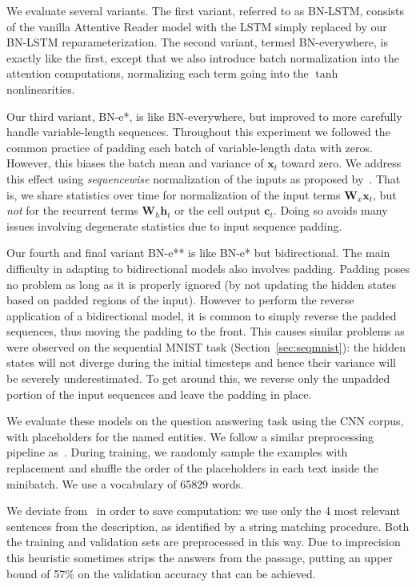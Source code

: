 \documentclass{article} %
\newcommand{\vect}[1]{\mathbf{#1}}
\newcommand{\mat}[1]{\mathbf{#1}}
\begin{document}
We evaluate several variants.
The first variant, referred to as BN-LSTM, consists of the vanilla Attentive Reader model with the LSTM simply replaced by our BN-LSTM reparameterization.
The second variant, termed BN-everywhere, is exactly like the first, except that we also introduce batch normalization into the attention computations, normalizing each term going into the $\tanh$ nonlinearities.

Our third variant, BN-e*, is like BN-everywhere, but improved to more carefully handle variable-length sequences.
Throughout this experiment we followed the common practice of padding each batch of variable-length data with zeros.
However, this biases the batch mean and variance of $\vect{x}_t$ toward zero.
We address this effect using \emph{sequencewise} normalization of the inputs as proposed by~\citep{cesar,baidu}.
That is, we share statistics over time for normalization of the input terms $\mat{W}_x \vect{x}_t$,
but \emph{not} for the recurrent terms $\mat{W}_h \vect{h}_t$ or the cell output $\vect{c}_t$.
Doing so avoids many issues involving degenerate statistics due to input sequence padding.

Our fourth and final variant BN-e** is like BN-e* but bidirectional.
The main difficulty in adapting to bidirectional models also involves padding.
Padding poses no problem as long as it is properly ignored (by not updating the hidden states based on padded regions of the input).
However to perform the reverse application of a bidirectional model, it is common to simply reverse the padded sequences, thus moving the padding to the front.
This causes similar problems as were observed on the sequential MNIST task (Section~\ref{sec:seqmnist}): the hidden states will not diverge during the initial timesteps and hence their variance will be severely underestimated.
To get around this, we reverse only the unpadded portion of the input sequences and leave the padding in place.

We evaluate these models on the question answering task using the CNN corpus, with placeholders for the named entities. We follow a similar preprocessing pipeline as~\citet{attentivereader}.
During training, we randomly sample the examples with replacement and shuffle the order of the placeholders in each text inside the minibatch.
We use a vocabulary of 65829 words.

We deviate from~\citet{attentivereader} in order to save computation:
we use only the 4 most relevant sentences from the description,
as identified by a string matching procedure.
Both the training and validation sets are preprocessed in this way.
Due to imprecision this heuristic sometimes strips the answers from the passage,
putting an upper bound of 57\% on the validation accuracy that can be achieved.
\end{document}
